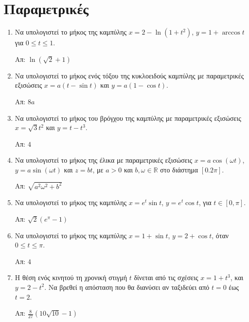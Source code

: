 \section*{Παραμετρικές}


\begin{enumerate}
  \item Να υπολογιστεί το μήκος της καμπύλης $x=2-\ln(1+t^{2})$, $y=1+\arccos t$ για 
    $0\leq t\leq 1$.

    \hfill Απ: $\ln(\sqrt{2}+1)$

  \item Να υπολογιστεί το μήκος ενός τόξου της κυκλοειδούς καμπύλης με παραμετρικές 
    εξισώσεις $ x = a(t - \sin{t}) $ και $ y = a(1- \cos{t}) $.

    \hfill Απ: $ 8a $ 

  \item Να υπολογιστεί το μήκος του βρόγχου της καμπύλης με παραμετρικές εξισώσεις 
    $ x= \sqrt{3} t^{2} $ και $ y = t - t^{3} $.

    \hfill Απ: $ 4 $ 

  \item Να υπολογιστεί το μήκος της έλικα με παραμετρικές εξισώσεις 
    $ x=a \cos{(\omega t)} $, $ y=a \sin{(\omega t)} $ και $ z= bt $, με $ a>0 $ 
    και $ b, \omega \in \mathbb{R} $ στο διάστημα $ [0.2 \pi] $.

    \hfill Απ: $ \sqrt{a^{2} \omega ^{2} + b^{2}} $  
  \item Να υπολογιστεί το μήκος της καμπύλης $ x = e^{t} \sin{t} $, $ y = e^{t}
    \cos{t} $, για $ t \in [0, \pi] $.

    \hfill Απ: $ \sqrt{2} (e^{\pi} - 1)  $

  \item Να υπολογιστεί το μήκος της καμπύλης $x=1+\sin t$, $y=2+\cos t$, όταν 
    $0\leq t\leq \pi$.

    \hfill Απ: $4$

  \item Η θέση ενός κινητού τη χρονική στιγμή $t$ δίνεται από τις σχέσεις 
    $x=1+t^{3}$, και  $y=2-t^{2}$. Να βρεθεί η απόσταση που θα διανύσει αν ταξιδεύει 
    από $t=0$ έως $t=2$.

    \hfill Απ: $\frac{8}{27}(10\sqrt{10}-1)$
\end{enumerate}




